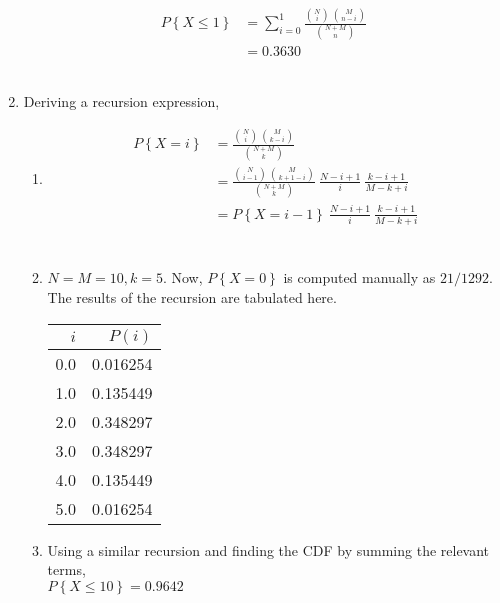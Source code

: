 \begin{enumerate}
		\begin{align}
			P \left\{X \leq 1 \right\} &= \sum\limits_{i = 0}^{1} \frac{\binom{N}{i}\ \binom{M}{n-i}}{\binom{N+M}{n}}\nonumber \\
			&= 0.3630
		\end{align}\\
	 
	
	\item Deriving a recursion expression,\\
	
		\begin{enumerate}
			\item \begin{align}
				P \left\{X = i\right\} &= \frac{\binom{N}{i}\ \binom{M}{k-i}}{\binom{N+M}{k}} \nonumber \\
				&= \frac{\binom{N}{i-1}\ \binom{M}{k+1-i}}{\binom{N+M}{k}}\ \frac{N-i+1}{i}\ \frac{k-i+1}{M-k+i} \nonumber \\
				&= P \left\{X = i-1\right\}\ \frac{N-i+1}{i}\ \frac{k-i+1}{M-k+i}  \\
			\end{align}\\
			
			\item $ N = M = 10, k = 5 $. Now, $ P \left\{X = 0 \right\} $ is computed manually as $ 21/1292 $. The results of the recursion are tabulated here. \\
			\begin{table}[H]
				\centering				
				\begin{tabular}{@{}rr@{}}
					\toprule
					$ i $  &       $  P(i) $ \\
					\midrule
					0.0 & 0.016254 \\
					1.0 & 0.135449 \\
					2.0 & 0.348297 \\
					3.0 & 0.348297 \\
					4.0 & 0.135449 \\
					5.0 & 0.016254 \\
					\bottomrule
				\end{tabular}
			\end{table}
			
			\item Using a similar recursion and finding the CDF by summing the relevant terms,\\ $ P\left\{X \leq 10\right\} = 0.9642$\\
			
		\end{enumerate}
	 

\end{enumerate}
